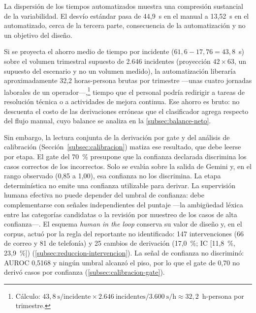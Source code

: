 La dispersión de los tiempos automatizados muestra una compresión sustancial de la variabilidad. El desvío estándar pasa de 44,9~s en el manual a 13,52~s en el automatizado, cerca de la tercera parte, consecuencia de la automatización y no un objetivo del diseño.

Si se proyecta el ahorro medio de tiempo por incidente (\(61{,}6 - 17{,}76 = 43{,}8\)~s) sobre el volumen trimestral supuesto de 2.646 incidentes (proyección \(42 \times 63\), un supuesto del escenario y no un volumen medido), la automatización liberaría aproximadamente 32,2 horas-persona brutas por trimestre ---unas cuatro jornadas laborales de un operador---,\footnote{Cálculo: \(43{,}8~\text{s/incidente} \times 2.646~\text{incidentes} / 3.600~\text{s/h} \approx 32{,}2\)~h-persona por trimestre.} tiempo que el personal podría redirigir a tareas de resolución técnica o a actividades de mejora continua. Ese ahorro es bruto: no descuenta el costo de las derivaciones erróneas que el clasificador agrega respecto del flujo manual, cuyo balance se analiza en la \autoref{subsec:balance-neto}.

Sin embargo, la lectura conjunta de la derivación por gate y del análisis de calibración (Sección~\ref{subsec:calibracion}) matiza ese resultado, que debe leerse por etapa. El gate del 70~\% presupone que la confianza declarada discrimina los casos correctos de los incorrectos. Solo se evalúa sobre la salida de Gemini y, en el rango observado (0,85 a 1,00), esa confianza no los discrimina. La etapa determinística no emite una confianza utilizable para derivar. La supervisión humana efectiva no puede depender del umbral de confianza: debe complementarse con señales independientes del puntaje ---la ambigüedad léxica entre las categorías candidatas o la revisión por muestreo de los casos de alta confianza---. El esquema \emph{human in the loop} conserva su valor de diseño y, en el corpus, actuó por la regla del reportante no identificado: 147 intervenciones (66 de correo y 81 de telefonía) y 25 cambios de derivación (17,0~\%; IC [11,8~\%, 23,9~\%]) (\autoref{subsec:reduccion-intervencion}). La señal de confianza no discriminó: AUROC 0,5168 y ningún umbral alcanzó el piso, por lo que el gate de 0,70 no derivó casos por confianza (\autoref{subsec:calibracion-gate}).

